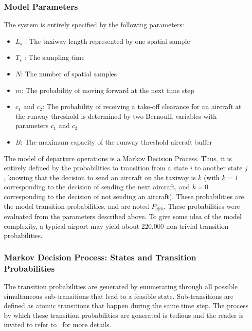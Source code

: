 \documentclass[letterpaper]{article}
\begin{document}
\subsubsection{Model Parameters}

The system is entirely specified by the following parameters:

\begin{itemize}
\item $L_s$ : The taxiway length represented by one spatial sample
\item $T_s$ : The sampling time
\item $N$: The number of spatial samples
\item $m$: The probability of moving forward at the next time step
\item $c_1$ and $c_2$: The probability of receiving a take-off clearance for an aircraft at the runway threshold is determined by two Bernoulli variables with parameters $c_1$ and $c_2$
\item $B$: The maximum capacity of the runway threshold aircraft buffer
\end{itemize}

The model of departure operations is a Markov Decision Process. 
Thus, it is entirely defined by the probabilities to transition from a state $i$ to another state $j$, 
knowing that  the decision to send an aircraft on the taxiway is $k$ 
(with $k=1$ corresponding to the decision of sending the next aircraft, and $k=0$ corresponding to the decision of not sending an aircraft). 
These probabilities are the model transition probabilities, and are noted $P_{j|ik}$. 
These probabilities were evaluated from the parameters described above. 
To give some idea of the model complexity, a typical airport may yield about 220,000 non-trivial transition probabilities.


\subsubsection{Markov Decision Process: States and Transition Probabilities} \label{s:transitions}

The transition probabilities are generated by enumerating through all possible simultaneous sub-transitions that lead to a feasible state. Sub-transitions are defined as atomic transitions that happen during the same time step. The process by which these transition probabilities are generated is tedious and the reader is invited to refer to~\cite{Bur:10} for more details.
\end{document}

